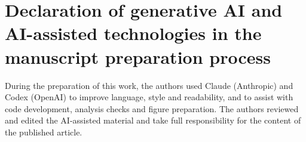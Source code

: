 \documentclass[5p,times]{elsarticle}
\begin{document}
\section*{Declaration of generative AI and AI-assisted technologies in the manuscript preparation process}
During the preparation of this work, the authors used Claude (Anthropic) and Codex (OpenAI) to improve language, style and readability, and to assist with code development, analysis checks and figure preparation. The authors reviewed and edited the AI-assisted material and take full responsibility for the content of the published article.



\end{document}
